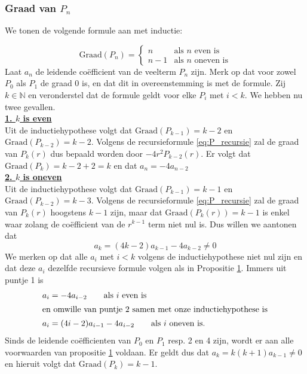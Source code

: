 \documentclass[12pt,a4paper]{article}
\theoremstyle{definition}
\numberwithin{equation}{section}
\begin{document}
\subsubsection*{Graad van $P_n$}
We tonen de volgende formule aan met inductie: 

\begin{equation*}
\text{Graad$(P_n)=$}
\begin{cases}
n & \text{als $n$ even is}\\
n-1 & \text{als $n$ oneven is}
\end{cases}
\end{equation*}
Laat $a_n$ de leidende coëfficient van de veelterm $P_n$ zijn.
Merk op dat voor zowel $P_0$ als $P_1$ de graad 0 is, en dat dit in overeenstemming is met de formule.
Zij $k\in\mathbb{N}$ en veronderstel dat de formule geldt voor elke $P_i$ met $i<k$. We hebben nu twee gevallen.\\
%
\underline{\textbf{1. $k$ is even}}\\
Uit de inductiehypothese volgt dat $\text{Graad}(P_{k-1}) = k-2$ en $\text{Graad}(P_{k-2}) = k-2$.
Volgens de recursieformule \eqref{eq:P_recursie} zal de graad van $P_k(r)$ dus bepaald worden door $-4r^2P_{k-2}(r)$. Er volgt dat $\text{Graad}(P_k) = k-2+2 = k$ en dat $a_n=-4a_{n-2}$
\\
\underline{\textbf{2. $k$ is oneven}}\\
Uit de inductiehypothese volgt dat $\text{Graad}(P_{k-1}) = k-1$ en $\text{Graad}(P_{k-2}) = k-3$.
Volgens de recursieformule \eqref{eq:P_recursie} zal de graad van $P_k(r)$ hoogstens $k-1$ zijn, maar dat $\text{Graad}(P_k(r))=k-1$ is enkel waar zolang de coëfficient van de $r^{k-1}$ term niet nul is. Dus willen we aantonen dat
$$a_k=(4k-2)a_{k-1}-4a_{k-2}\neq0$$
We merken op dat alle $a_i$ met $i<k$ volgens de inductiehypothese niet nul zijn en dat deze $a_i$ dezelfde recursieve formule volgen als in Propositie \hyperref[thm:prop1]{1}. Immers uit puntje 1 is
\begin{align*}
a_i&=-4a_{i-2} \qquad \text{als $i$ even is} \\
\intertext{en omwille van puntje $2$ samen met onze inductiehypothese is}
a_i&=(4i-2)a_{i-1}-4a_{i-2} \qquad \text{als $i$ oneven is.}
\end{align*}
Sinds de leidende coëfficienten van $P_0$ en $P_1$ resp. 2 en 4 zijn, wordt er aan alle voorwaarden van propositie \hyperref[thm:prop1]{1} voldaan. 
Er geldt dus dat $a_k = k(k+1)a_{k-1} \neq 0$ en hieruit volgt dat $\text{Graad}(P_k) = k-1$.
\end{document}
